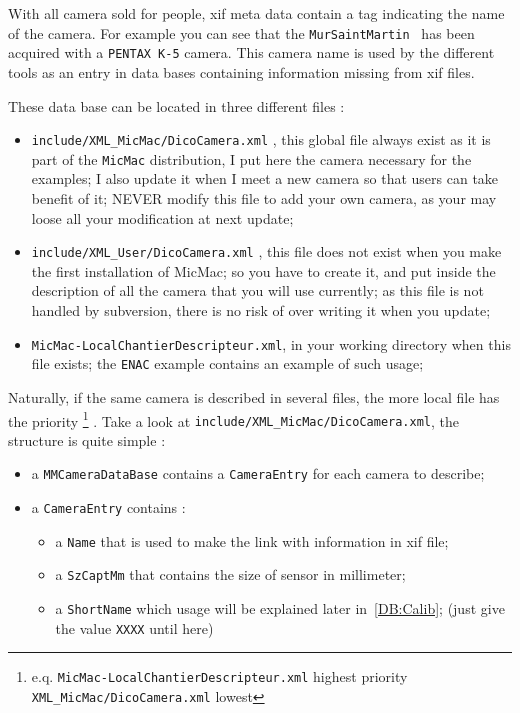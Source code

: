 With all camera sold for people, xif meta data contain a tag indicating the
name of the camera.  For example you can see that the {\tt MurSaintMartin }
has been acquired with a {\tt PENTAX K-5} camera. This camera name is
used by the different tools as an entry in data bases containing  information
missing from xif files.

These data base can be located in three different files :

\begin{itemize}
   \item  {\tt  include/XML\_MicMac/DicoCamera.xml} , this global file always exist as
	 it is part of the {\tt MicMac} distribution, I put here the camera necessary
	 for the examples; I also update it when I meet a new camera
	 so that users can take benefit of it;
	 NEVER modify this file to add your own camera, as your may loose all your
	 modification at next update;

   \item  {\tt  include/XML\_User/DicoCamera.xml} , this file does not exist
	 when you make the first installation of MicMac; so you have to create it,
	 and put inside the description of all the camera that you will use
	 currently; as this file is not handled by subversion, there is no risk
	 of over writing it when you update;

   \item  {\tt  MicMac-LocalChantierDescripteur.xml},  in your working
	  directory when this file exists; the {\tt ENAC} example contains
	  an example of such usage;
\end{itemize}

Naturally, if the same camera is described in several files, the more local file has the
priority \footnote{e.q. {\tt MicMac-LocalChantierDescripteur.xml} highest priority
{\tt XML\_MicMac/DicoCamera.xml} lowest} .
Take a look at  {\tt  include/XML\_MicMac/DicoCamera.xml}, the structure is quite
simple :

\begin{itemize}
    \item a {\tt MMCameraDataBase} contains  a {\tt CameraEntry} for each  camera
	  to describe;
    \item a {\tt CameraEntry} contains :


     \begin{itemize}
	   \item a {\tt Name} that is used to make the link with information in xif file;
	   \item a {\tt SzCaptMm} that contains the size of sensor in millimeter;
	   \item a {\tt ShortName} which usage will be explained later  in~\ref{DB:Calib};
		(just give the value {\tt XXXX} until here)
     \end{itemize}
\end{itemize}


